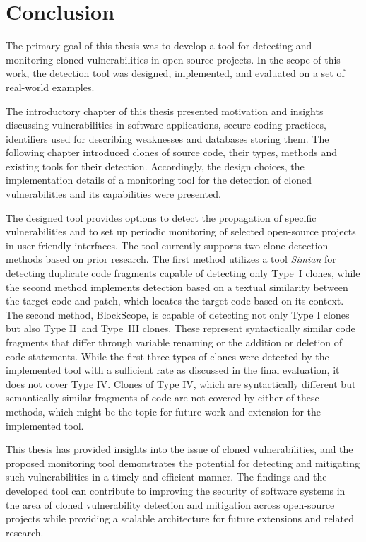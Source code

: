 
\chapter{Conclusion}
\label{chapter:conclusion}
The primary goal of this thesis was to develop a tool for detecting and monitoring cloned vulnerabilities in open-source projects.
In the scope of this work, the detection tool was designed, implemented, and evaluated on a set of real-world examples.

The introductory chapter of this thesis presented motivation and insights discussing vulnerabilities in software applications,
secure coding practices, identifiers used for describing weaknesses and databases storing them.
The following chapter introduced clones of source code, their types, methods and existing tools for their detection.
Accordingly, the design choices, the implementation details of a monitoring tool for the detection of cloned vulnerabilities
and its capabilities were presented.

The designed tool provides options to detect the propagation of specific vulnerabilities and to set up periodic monitoring
of selected open-source projects in user-friendly interfaces. The tool currently supports two clone detection
methods based on prior research. The first method utilizes a tool \emph{Simian} for detecting duplicate code fragments capable of
detecting only Type~I clones, while the second method implements detection based on a textual similarity between the target code
and patch, which locates the target code based on its context. The second method, BlockScope, is capable of detecting not only Type I clones but also Type II~and Type~III clones. These represent syntactically similar code fragments that differ through variable renaming or the addition or deletion of code statements. While the first three types of clones were detected by the implemented tool with
a sufficient rate as discussed in the final evaluation, it does not cover Type IV. Clones of Type IV, which are syntactically
different but semantically similar fragments of code are not covered by either of these methods, which might be the topic for
future work and extension for the implemented tool.

This thesis has provided insights into the issue of cloned vulnerabilities, and the proposed monitoring tool demonstrates
the potential for detecting and mitigating such vulnerabilities in a timely and efficient manner. The findings and the developed
tool can contribute to improving the security of software systems in the area of cloned vulnerability detection and mitigation
across open-source projects while providing a scalable architecture for future extensions and related research.
